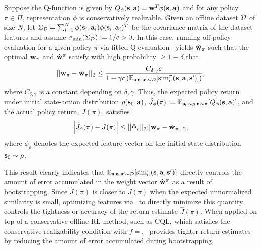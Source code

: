\begin{theorem}
\label{thm:return_bound}
Suppose the Q-function is given by $Q_\phi(\mathbf{s}, \mathbf{a}) = \mathbf{w}^T \phi(\mathbf{s}, \mathbf{a})$ and for any policy $\pi \in \Pi$, representation $\phi$ is conservatively realizable. 
Given an offline dataset $\mathcal{D}$ of size $N$, let $\Sigma_{\mathcal{D}} = \sum_{i=1}^N \phi(\mathbf{s}_i, \mathbf{a}_i) \phi(\mathbf{s}_i, \mathbf{a}_i)^T$ be the covariance matrix of the dataset features and assume $\sigma_{\min}(\Sigma_{\mathcal{D}}) := 1/c >0$. In this case, running off-policy evaluation for a given policy $\pi$ via fitted Q-evaluation~\citep{} yields $\hat{\mathbf{w}}_\pi$ such that the optimal $\mathbf{w}_\pi$ and $\hat{\mathbf{w}}^\pi$ satisfy with high probability $\geq 1-\delta$ that
\begin{equation*}
    ||\mathbf{w}_\pi - \hat{\mathbf{w}}_\pi||_2 \leq \frac{C_{\delta, \gamma} c}{1 - \gamma c \left(\mathbb{E}_{\mathbf{s}, \mathbf{a}, \mathbf{s}' \sim \mathcal{D}}[\mathrm{sim}_{\mathrm{u}}^\pi(\mathbf{s}, \mathbf{a}, \mathbf{s}')] \right)},
\end{equation*}
where $C_{\delta, \gamma}$ is a constant depending on $\delta, \gamma$. Thus, the expected policy return under initial state-action distribution $\rho(\mathbf{s}_0, \mathbf{a})$, $\hat{J}_\phi(\pi) := \mathbb{E}_{\mathbf{s}_0 \sim \rho, \mathbf{a} \sim \pi}[Q_\phi(\mathbf{s}, \mathbf{a})]$, and the actual policy return, $J(\pi)$, satisfies
\begin{equation*}
    \left\vert \hat{J}_\phi(\pi) - J(\pi) \right\vert \leq ||\Phi_\rho||_2 ||\mathbf{w}_\pi - \hat{\mathbf{w}}_\pi||_2,
\end{equation*}
where $\phi_\rho$ denotes the expected feature vector on the initial state distribution $\mathbf{s}_0 \sim \rho$.
\end{theorem}
This result clearly indicates that $\mathbb{E}_{\mathbf{s}, \mathbf{a}, \mathbf{s}' \sim \mathcal{D}}[\mathrm{sim}_{\mathrm{u}}^\pi(\mathbf{s}, \mathbf{a}, \mathbf{s}')]$ directly controls the amount of error accumulated in the weight vector $\hat{\mathbf{w}}^\pi$ as a result of bootstrapping. Since $\hat{J}(\pi)$ is closer to $J(\pi)$ when the expected unnormalized similarity is small, optimizing features via \methodname\ to directly minimize this quantity controls the tightness or accuracy of the return estimate $\hat{J}(\pi)$. When applied on top of a conservative offline RL method, such as CQL, which satisfies the conservative realizability condition with $f=$, \methodname\ provides tighter return estimates by reducing the amount of error accumulated during bootstrapping,

